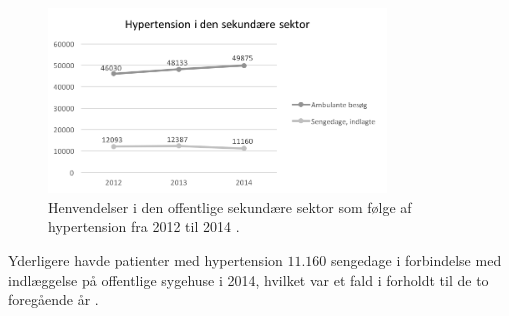 \begin{figure}[H]
\centering
\includegraphics[width=0.8\textwidth]{figures/hyp_sekundaer}
\caption{Henvendelser i den offentlige sekundære sektor som følge af hypertension fra 2012 til 2014 \citep{sundhedsdatastyrelsen2016}.}
\label{fig:hyp_sekundaer}
\end{figure}

\noindent
Yderligere havde patienter med hypertension $11.160$ sengedage i forbindelse med indlæggelse på offentlige sygehuse i 2014, hvilket var et fald i forholdt til de to foregående år \citep{sundhedsdatastyrelsen2016}. 